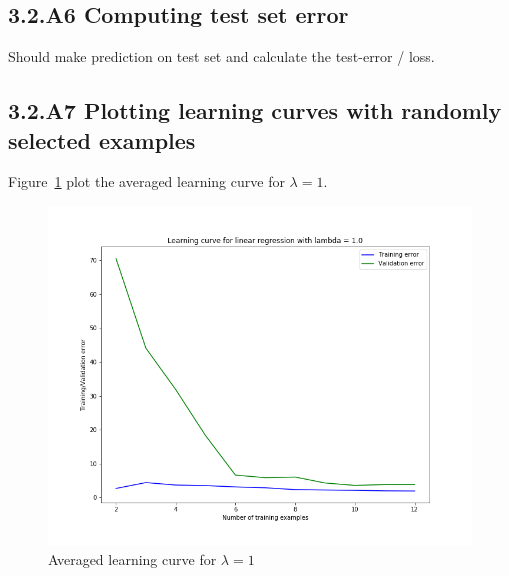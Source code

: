 \documentclass[english,11pt]{article}
\begin{document}
\subsection*{3.2.A6 Computing test set error}
Should make prediction on test set and calculate the test-error / loss.

\subsection*{3.2.A7 Plotting learning curves with randomly selected examples}
Figure~\ref{fig:3_2_A7} plot the averaged learning curve for $\lambda = 1$.

\begin{figure}[h]
\centering
\includegraphics[width=.6\textwidth]{../hw1/part2/fig3_2_A7.png}
\caption{Averaged learning curve for $\lambda = 1$}
\label{fig:3_2_A7}
\end{figure}
\end{document}
